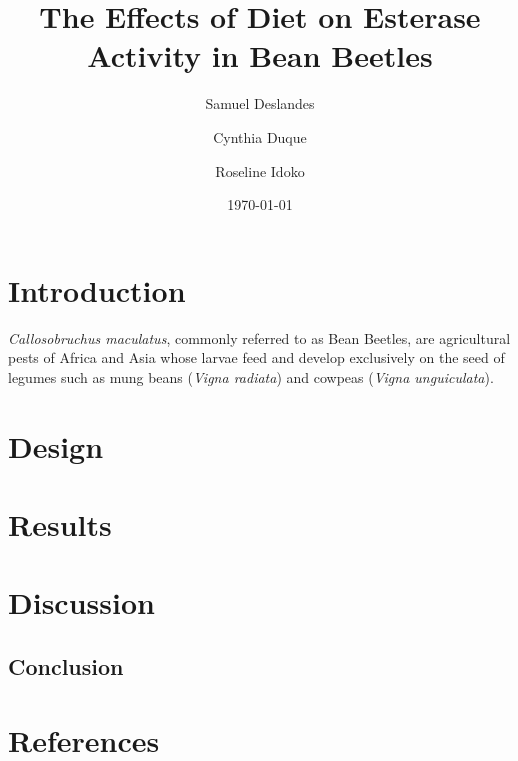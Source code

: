 \documentclass[12pt]{article}
\title{The Effects of Diet on Esterase Activity in Bean Beetles}
\author{Samuel Deslandes \and Cynthia Duque \and Roseline Idoko}
\date{\today}
\begin{document}
\maketitle

\doublespacing

\section{Introduction} 
	\textit{Callosobruchus maculatus}, commonly referred to as Bean Beetles, are agricultural pests of Africa and Asia whose larvae feed and develop exclusively on the seed of legumes such as mung beans (\textit{Vigna radiata}) and cowpeas (\textit{Vigna unguiculata}). 
\section{Design}

\section{Results}

\section{Discussion}

\subsection{Conclusion}

\section{References}
\end{document}
